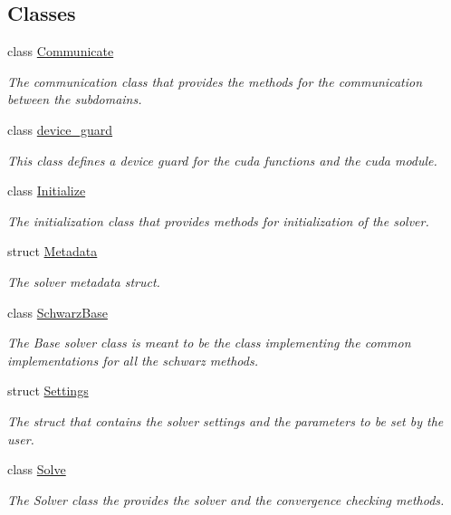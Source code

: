 \subsection*{Classes}
\begin{DoxyCompactItemize}
\item 
class \hyperlink{classschwz_1_1Communicate}{Communicate}
\begin{DoxyCompactList}\small\item\em The communication class that provides the methods for the communication between the subdomains. \end{DoxyCompactList}\item 
class \hyperlink{classschwz_1_1device__guard}{device\+\_\+guard}
\begin{DoxyCompactList}\small\item\em This class defines a device guard for the cuda functions and the cuda module. \end{DoxyCompactList}\item 
class \hyperlink{classschwz_1_1Initialize}{Initialize}
\begin{DoxyCompactList}\small\item\em The initialization class that provides methods for initialization of the solver. \end{DoxyCompactList}\item 
struct \hyperlink{structschwz_1_1Metadata}{Metadata}
\begin{DoxyCompactList}\small\item\em The solver metadata struct. \end{DoxyCompactList}\item 
class \hyperlink{classschwz_1_1SchwarzBase}{Schwarz\+Base}
\begin{DoxyCompactList}\small\item\em The Base solver class is meant to be the class implementing the common implementations for all the schwarz methods. \end{DoxyCompactList}\item 
struct \hyperlink{structschwz_1_1Settings}{Settings}
\begin{DoxyCompactList}\small\item\em The struct that contains the solver settings and the parameters to be set by the user. \end{DoxyCompactList}\item 
class \hyperlink{classschwz_1_1Solve}{Solve}
\begin{DoxyCompactList}\small\item\em The Solver class the provides the solver and the convergence checking methods. \end{DoxyCompactList}\item 

\end{DoxyCompactItemize}
